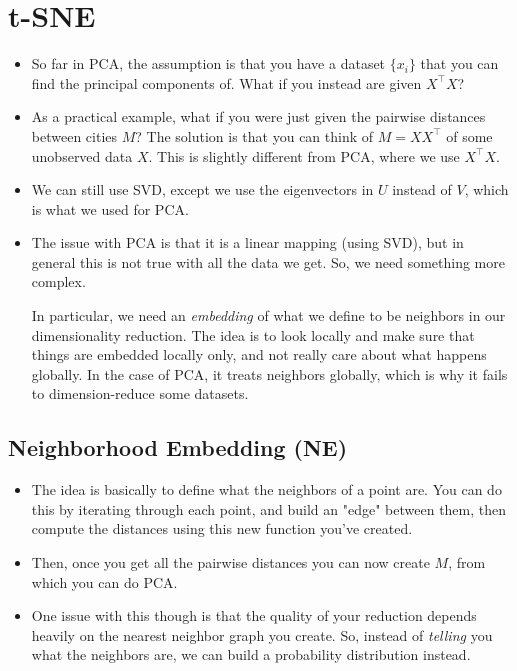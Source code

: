 \section{t-SNE}
\begin{itemize}
	\item So far in PCA, the assumption is that you have a dataset \( \{x_i\} \) that
		you can find the principal components of. What if you instead are given \(
		X^{\top}X \)? 
	\item As a practical example, what if you were just given the pairwise distances
		between cities \( M \)? The solution is that you can think of \( M = X
		X^{\top} \) of some unobserved data \( X \). This is slightly different from
		PCA, where we use \( X^{\top}X \). 

	\item We can still use SVD, except we use the eigenvectors in \( U \) instead of
		\( V \), which is what we used for PCA. 
	\item The issue with PCA is that it is a linear mapping (using SVD), but in
		general this is not true with all the data we get. So, we need something more
		complex. 

		In particular, we need an \textit{embedding} of what we define to be
		neighbors in our dimensionality reduction. The idea is to look locally and
		make sure that things are embedded locally only, and not really care about
		what happens globally. In the case of PCA, it treats neighbors globally,
		which is why it fails to dimension-reduce some datasets.   
\end{itemize}
\subsection{Neighborhood Embedding (NE)}
\begin{itemize}
	\item The idea is basically to define what the neighbors of a point are. You can
		do this by iterating through each point, and build an "edge" between them,
		then compute the distances using this new function you've created. 
	\item Then, once you get all the pairwise distances you can now create \( M \),
		from which you can do PCA.
	\item One issue with this though is that the quality of your reduction depends
		heavily on the nearest neighbor graph you create. So, instead of
		\textit{telling} you what the neighbors are, we can build a probability
		distribution instead.  
\end{itemize}
